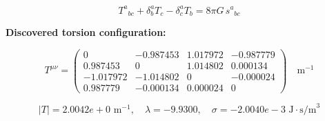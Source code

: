 
\begin{equation}
  T^a{}_{bc} + \delta^a_b T_c - \delta^a_c T_b = 8\pi G \, s^a{}_{bc}
\end{equation}

\textbf{Discovered torsion configuration:}

\begin{equation}
  T^{\mu\nu} = \begin{pmatrix}
    0 & -0.987453 & 1.017972 & -0.987779 \\
    0.987453 & 0 & 1.014802 & 0.000134 \\
    -1.017972 & -1.014802 & 0 & -0.000024 \\
    0.987779 & -0.000134 & 0.000024 & 0
  \end{pmatrix} \quad \text{m}^{-1}
\end{equation}

\begin{equation}
  |T| = 2.0042e+0 \text{ m}^{-1}, \quad
  \lambda = -9.9300, \quad
  \sigma = -2.0040e-3 \text{ J}\cdot\text{s/m}^3
\end{equation}
